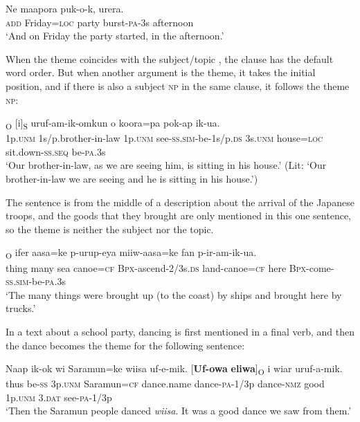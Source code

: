 \ea%
\label{ex:x1698}
\gll Ne    maapora  puk-o-k,  urera.  \\
\textsc{add}  Friday=\textsc{loc}  party  burst-\textsc{pa}-3s  afternoon      \\
\glt`And on Friday the party started, in the afternoon.'
\z


When the theme coincides with the subject/topic , the clause has the default word order. But when another argument is the theme, it takes the initial position, and if there is also a subject \textsc{np} in the same clause, it follows the theme  \textsc{np}: 

\ea%
\label{ex:x1473}
\textsubscript{O}  [i]\textsubscript{S}  uruf-am-ik-omkun o  koora=pa  pok-ap  ik-ua.\\
1p.\textsc{unm}  1s/p.brother-in-law  1p.\textsc{unm}  see-\textsc{ss}.\textsc{sim}-be-1s/p.\textsc{ds} 3s.\textsc{unm}  house=\textsc{loc}  sit.down-\textsc{ss}.\textsc{seq}  be-\textsc{pa}.3s\\
\glt`Our brother-in-law, as we are seeing him, is sitting in his house.' (Lit: `Our brother-in-law we are seeing and he is sitting in his house.')
\z
{}


The sentence  is from the middle of a description about the arrival of the Japanese troops, and the goods that they brought are only mentioned in this one sentence, so the theme is neither the subject nor the topic. 

\ea%
\label{ex:x1701}
\textsubscript{O}  ifer  aasa=ke  p-urup-eya miiw-aasa=ke  fan  p-ir-am-ik-ua. \\
thing  many  sea  canoe=\textsc{cf}  \textsc{Bpx}-ascend-2/3s.\textsc{ds} land-canoe=\textsc{cf}  here  \textsc{Bpx}-come-\textsc{ss}.\textsc{sim}-be-\textsc{pa}.3s     \\
\glt`The many things were brought up (to the coast) by ships and brought here by trucks.'
\z


In a text about a school party, dancing is first mentioned in a final verb, and then the dance becomes the theme for the following sentence:

\ea%
\label{ex:x1702}
\gll Naap  ik-ok  wi  Saramun=ke  wiisa  uf-e-mik. [\textbf{Uf-owa}  \textbf{eliwa}]\textsubscript{O}  i  wiar  uruf-a-mik. \\
thus  be-\textsc{ss}  3p.\textsc{unm}  Saramun=\textsc{cf}  dance.name  dance-\textsc{pa}-1/3p dance-\textsc{nmz}  good  1p.\textsc{unm}  3.\textsc{dat}  see-\textsc{pa}-1/3p     \\
\glt`Then the Saramun people danced \textit{wiisa}. It was a good dance we saw from them.'
\z


